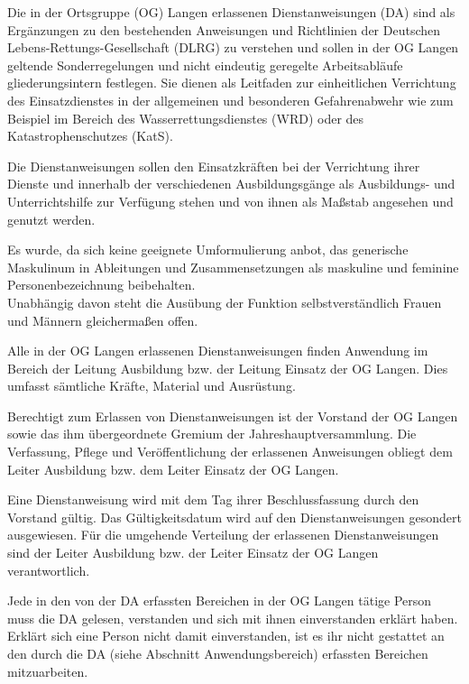 
\renewcommand{\dienstanweisung}{DA\,0-01/2013}
\thispagestyle{scrheadings}
Die in der Ortsgruppe (OG) Langen erlassenen Dienstanweisungen (DA) sind als Ergänzungen zu den bestehenden Anweisungen und Richtlinien der Deutschen Lebens-Rettungs-Gesellschaft (DLRG) zu verstehen und sollen in der OG Langen geltende Sonderregelungen und nicht eindeutig geregelte Arbeitsabläufe gliederungsintern festlegen. Sie dienen als Leitfaden zur einheitlichen Verrichtung des Einsatzdienstes in der allgemeinen und besonderen Gefahrenabwehr wie zum Beispiel im Bereich des Wasserrettungsdienstes (WRD) oder des Katastrophenschutzes (KatS).

Die Dienstanweisungen sollen den Einsatzkräften bei der Verrichtung ihrer Dienste und innerhalb der verschiedenen Ausbildungsgänge als Ausbildungs- und Unterrichtshilfe zur Verfügung stehen und von ihnen als Maßstab angesehen und genutzt werden.

Es wurde, da sich keine geeignete Umformulierung anbot, das generische Maskulinum in Ableitungen und Zusammensetzungen als maskuline und feminine Personenbezeichnung beibehalten.\\
Unabhängig davon steht die Ausübung der Funktion selbstverständlich Frauen und Männern gleichermaßen offen.

Alle in der OG Langen erlassenen Dienstanweisungen finden Anwendung im Bereich der Leitung Ausbildung bzw. der Leitung Einsatz der OG Langen. Dies umfasst sämtliche Kräfte, Material und Ausrüstung.

Berechtigt zum Erlassen von Dienstanweisungen ist der Vorstand der OG Langen sowie das ihm übergeordnete Gremium der Jahreshauptversammlung. Die Verfassung, Pflege und Veröffentlichung der erlassenen Anweisungen obliegt dem Leiter Ausbildung bzw. dem Leiter Einsatz der OG Langen.

Eine Dienstanweisung wird mit dem Tag ihrer Beschlussfassung durch den Vorstand gültig. Das Gültigkeitsdatum wird auf den Dienstanweisungen gesondert ausgewiesen. Für die umgehende Verteilung der erlassenen Dienstanweisungen sind der Leiter Ausbildung bzw. der Leiter Einsatz der OG Langen verantwortlich.

Jede in den von der DA erfassten Bereichen in der OG Langen tätige Person muss die DA gelesen, verstanden und sich mit ihnen einverstanden erklärt haben. Erklärt sich eine Person nicht damit einverstanden, ist es ihr nicht gestattet an den durch die DA (siehe Abschnitt Anwendungsbereich) erfassten Bereichen mitzuarbeiten.

